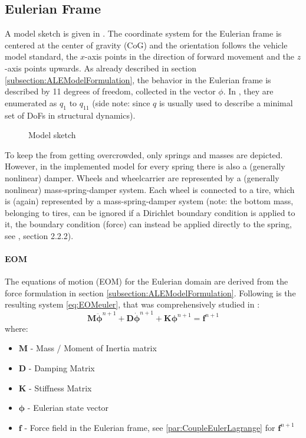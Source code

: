 \subsection{Eulerian Frame} \label{subsection:euler}
A model sketch is given in . 
The coordinate system for the Eulerian frame is centered at the center of gravity (CoG) and the orientation follows the vehicle model standard, the $x$-axis points in the direction of forward movement and the $z$-axis points upwards. 
As already described in section \ref{subsection:ALEModelFormulation}, the behavior in the Eulerian frame is described by 11 degrees of freedom, collected in the vector $\phi$. In , they are enumerated as $q_1$ to $q_{11}$ (side note: since $q$ is usually used to describe a minimal set of DoFs in structural dynamics).
\begin{figure}
	\centering
	
	\caption{Model sketch}
	\label{fig:model}
\end{figure}

To keep the  from getting overcrowded, only springs and masses are depicted. 
However, in the implemented model for every spring there is also a (generally nonlinear) damper.
Wheels and wheelcarrier are represented by a (generally nonlinear) mass-spring-damper system. Each wheel is connected to a tire, which is (again) represented by a mass-spring-damper system (note: the bottom mass, belonging to tires, can be ignored if a Dirichlet boundary condition is applied to it, the boundary condition (force) can instead be applied directly to the spring, see \cite{mitschke2014}, section 2.2.2).

\paragraph{EOM}
The equations of motion (EOM) for the Eulerian domain are derived from the force formulation in section \ref{subsection:ALEModelFormulation}.
Following is the resulting system \eqref{eq:EOMeuler}, that was comprehensively studied in \cite{sicklingerthesis}:
\begin{equation} \label{eq:EOMeuler}
     \boldsymbol{M} \ddot{\boldsymbol{\phi}}^{n+1}+ \boldsymbol{D} \dot{\boldsymbol{\phi}}^{n+1} + \boldsymbol{K}\boldsymbol{\phi}^{n+1}=\boldsymbol{f}^{n+1}
\end{equation}
where:
    \begin{itemize}
        \item $\boldsymbol{M}$ - Mass / Moment of Inertia matrix
        \item $\boldsymbol{D}$ - Damping Matrix
        \item $\boldsymbol{K}$ - Stiffness Matrix
        \item $\boldsymbol{\phi}$ - Eulerian state vector
        \item $\boldsymbol{f}$ - Force field in the Eulerian frame, see \ref{par:CoupleEulerLagrange} for $\boldsymbol{f}^{n+1}$
    \end{itemize}

